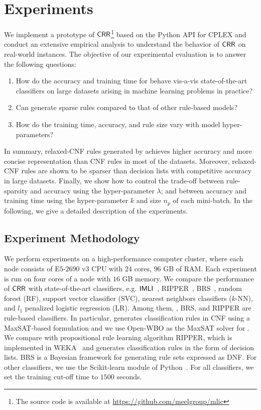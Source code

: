 \section{Experiments}\label{interpretability_crr_sec:experiment}
We implement a prototype  of  $ \mathsf{CRR} $\footnote{The source code is available at \url{https://github.com/meelgroup/mlic}} based on the  Python API for CPLEX  and conduct an extensive  empirical analysis to understand the behavior of $\mathsf{CRR}$ on real-world instances. The objective of our experimental evaluation is to answer the following questions:


\begin{enumerate}
	\item How do the accuracy and training time for  {\crr}  behave vis-a-vis state-of-the-art classifiers on large datasets arising in machine learning problems in practice?
	\item Can {\crr} generate sparse rules compared to that of  other rule-based models? 
	\item How do the training time, accuracy, and rule size vary with model hyper-parameters?
\end{enumerate}


In summary, relaxed-CNF rules generated by {\crr} achieves higher accuracy and more concise representation than CNF rules in most of the datasets. Moreover, relaxed-CNF rules are shown to be sparser than decision lists with competitive accuracy in large datasets.  Finally, we show how to control the trade-off between rule-sparsity and accuracy using the hyper-parameter $ \lambda $; and between accuracy and training time using the hyper-parameter $ k $ and size $ n_p $ of each mini-batch. In the following, we give a detailed description of the experiments. 



\subsection{Experiment Methodology}
We perform experiments on a high-performance computer cluster, where each node consists of E$ 5$-$2690\text{ v}3 $ CPU with $ 24 $ cores, $ 96 $ GB of RAM. Each experiment is run on four cores of a node with $ 16 $ GB memory.   We compare the performance of  $ \mathsf{CRR} $   with  state-of-the-art classifiers, e.g. $ \mathsf{IMLI}  $~\cite{GM2019}, RIPPER~\cite{C1995}, BRS~\cite{WRDLKM2017},  random forest (RF), support vector classifier (SVC), nearest neighbors classifiers ($ k $-NN), and $ l_1 $ penalized logistic regression (LR). Among them, {\IMLI}, BRS, and RIPPER are rule-based classifiers. In particular,
{\IMLI} generates classification rules in CNF using a MaxSAT-based formulation and we use Open-WBO \cite{MML2014} as the MaxSAT solver for {\IMLI}. We compare with propositional rule learning algorithm RIPPER, which is implemented in WEKA~\cite{HFHPRW2009} and generates classification rules in the form of decision lists. BRS is a Bayesian framework for generating rule sets expressed as DNF. For  other classifiers, we use the Scikit-learn module of Python~\cite{PVGMTGB2011}. For all  classifiers, we set the training cut-off time to $ 1500 $  {seconds}. 

